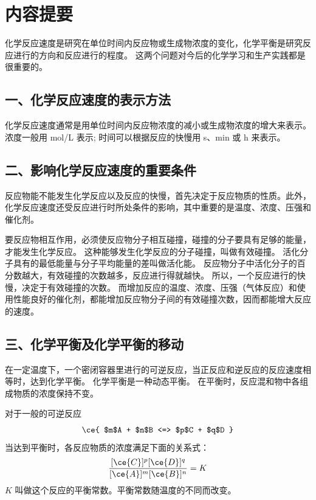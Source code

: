 \section*{内容提要}
\setcounter{subsection}{0}
化学反应速度是研究在单位时间内反应物或生成物浓度的变化，化学平衡是研究反应进行的方向和反应进行的程度。 
这两个问题对今后的化学学习和生产实践都是很重要的。

\subsection*{一、化学反应速度的表示方法}
化学反应速度通常是用单位时间内反应物浓度的减小或生成物浓度的增大来表示。
浓度一般用 \unit{mol/L} 表示; 时间可以根据反应的快慢用 \unit{s}、\unit{min} 或 \unit{h} 来表示。

\subsection*{二、影响化学反应速度的重要条件}
反应物能不能发生化学反应以及反应的快慢，首先决定于反应物质的性质。此外，化学反应速度还受反应进行时所处条件的影响，其中重要的是温度、浓度、压强和催化剂。

要反应物相互作用，必须使反应物分子相互碰撞，碰撞的分子要具有足够的能量，才能发生化学反应。
这种能够发生化学反应的分子碰撞，叫做有效碰撞。
活化分子具有的最低能量与分子平均能量的差叫做活化能。
反应物分子中活化分子的百分数越大，有效碰撞的次数越多，反应进行得就越快。
所以，一个反应进行的快慢，决定于有效碰撞的次数。
而增加反应的温度、浓度、压强（气体反应）和使用性能良好的催化剂，都能增加反应物分子间的有效碰撞次数，因而都能增大反应的速度。

\subsection*{三、化学平衡及化学平衡的移动}
在一定温度下，一个密闭容器里进行的可逆反应，当正反应和逆反应的反应速度相等时，达到化学平衡。
化学平衡是一种动态平衡。
在平衡时，反应混和物中各组成物质的浓度保持不变。

对于一般的可逆反应
\[ \ce{ $m$A + $n$B <=> $p$C + $q$D } \]
当达到平衡时，各反应物质的浓度满足下面的关系式：
\[\frac{[\ce{C}]^p[\ce{D}]^q}{[\ce{A}]^m[\ce{B}]^n}=K\]
$K$ 叫做这个反应的平衡常数。平衡常数随温度的不同而改变。

